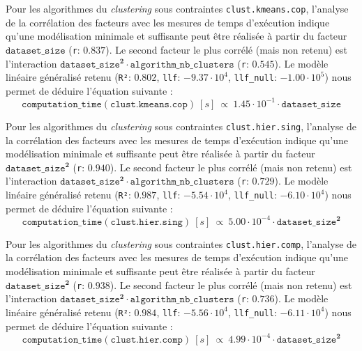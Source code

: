 			Pour les algorithmes du \textit{clustering} sous contraintes \texttt{clust.kmeans.cop}, l'analyse de la corrélation des facteurs avec les mesures de temps d'exécution indique qu'une modélisation minimale et suffisante peut être réalisée à partir du facteur $\texttt{dataset\_size}$ (\texttt{r}: $0.837$).
			Le second facteur le plus corrélé (mais non retenu) est l'interaction $\texttt{dataset\_size}^{\textbf{2}} \cdot \texttt{algorithm\_nb\_clusters}$ (\texttt{r}: $0.545$).
			Le modèle linéaire généralisé retenu (\texttt{R²}: $0.802$, \texttt{llf}: $-9.37 \cdot 10^{4}$, \texttt{llf\_null}: $-1.00 \cdot 10^{5}$) nous permet de déduire l'équation suivante :
			\begin{equation}
				\texttt{computation\_time}(\texttt{clust.kmeans.cop})~[s]~
				\propto~1.45 \cdot 10^{-1} \cdot \texttt{dataset\_size}
			\end{equation}
			
			Pour les algorithmes du \textit{clustering} sous contraintes \texttt{clust.hier.sing}, l'analyse de la corrélation des facteurs avec les mesures de temps d'exécution indique qu'une modélisation minimale et suffisante peut être réalisée à partir du facteur $\texttt{dataset\_size}^{\textbf{2}}$ (\texttt{r}: $0.940$).
			Le second facteur le plus corrélé (mais non retenu) est l'interaction $\texttt{dataset\_size}^{\textbf{2}} \cdot \texttt{algorithm\_nb\_clusters}$ (\texttt{r}: $0.729$).
			Le modèle linéaire généralisé retenu (\texttt{R²}: $0.987$, \texttt{llf}: $-5.54 \cdot 10^{4}$, \texttt{llf\_null}: $-6.10 \cdot 10^{4}$) nous permet de déduire l'équation suivante :
			\begin{equation}
				\texttt{computation\_time}(\texttt{clust.hier.sing})~[s]~
				\propto~5.00 \cdot 10^{-4} \cdot \texttt{dataset\_size}^{\textbf{2}}
			\end{equation}
			
			Pour les algorithmes du \textit{clustering} sous contraintes \texttt{clust.hier.comp}, l'analyse de la corrélation des facteurs avec les mesures de temps d'exécution indique qu'une modélisation minimale et suffisante peut être réalisée à partir du facteur $\texttt{dataset\_size}^{\textbf{2}}$ (\texttt{r}: $0.938$).
			Le second facteur le plus corrélé (mais non retenu) est l'interaction $\texttt{dataset\_size}^{\textbf{2}} \cdot \texttt{algorithm\_nb\_clusters}$ (\texttt{r}: $0.736$).
			Le modèle linéaire généralisé retenu (\texttt{R²}: $0.984$, \texttt{llf}: $-5.56 \cdot 10^{4}$, \texttt{llf\_null}: $-6.11 \cdot 10^{4}$) nous permet de déduire l'équation suivante :
			\begin{equation}
				\texttt{computation\_time}(\texttt{clust.hier.comp})~[s]~
				\propto~4.99 \cdot 10^{-4} \cdot \texttt{dataset\_size}^{\textbf{2}}
			\end{equation}

